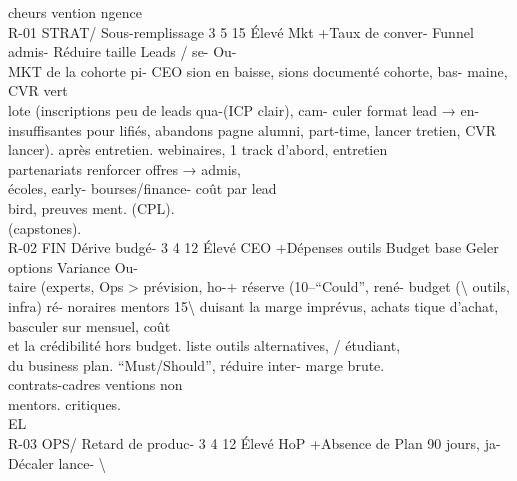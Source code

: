 cheurs           vention           ngence\\
R-01   STRAT/   Sous-remplissage 3 5 15 Élevé Mkt     +Taux de conver- Funnel      admis- Réduire      taille Leads / se- Ou-\\
MKT      de la cohorte pi-             CEO      sion en baisse, sions documenté cohorte,          bas- maine, CVR vert\\
lote (inscriptions                     peu de leads qua-(ICP clair), cam- culer      format lead → en-\\
insuffisantes pour                     lifiés, abandons pagne     alumni, part-time, lancer tretien, CVR\\
lancer).                               après entretien. webinaires,       1 track d’abord, entretien\\
partenariats       renforcer offres →        admis,\\
écoles,     early- bourses/finance- coût par lead\\
bird,    preuves ment.                (CPL).\\
(capstones).\\
R-02   FIN      Dérive      budgé- 3 4 12 Élevé CEO   +Dépenses outils Budget        base Geler       options Variance       Ou-\\
taire    (experts,              Ops    \textgreater{} prévision, ho-+ réserve (10–“Could”,            rené- budget (\textbackslash{}%
outils, infra) ré-                     noraires mentors 15\textbackslash{}%
duisant la marge                       imprévus, achats tique     d’achat, basculer        sur mensuel, coût\\
et la crédibilité                      hors budget.     liste       outils alternatives,       /   étudiant,\\
du business plan.                                       “Must/Should”, réduire          inter- marge brute.\\
contrats-cadres ventions          non\\
mentors.           critiques.\\
\vspace{0.5em}
\vspace{0.5em}
\vspace{0.5em}
\vspace{0.5em}
EL\\
R-03   OPS/    Retard de produc- 3 4 12 Élevé HoP     +Absence         de Plan 90 jours, ja- Décaler     lance- \textbackslash{}%
